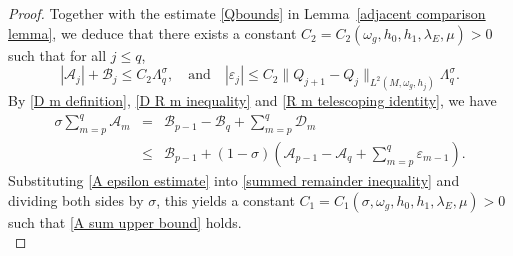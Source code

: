 \documentclass[12pt, reqno]{amsart}
\newcommand\cA{{\mathcal A}}
\newcommand\cB{{\mathcal B}}
\newcommand\cD{{\mathcal D}}
\theoremstyle{plain}
\theoremstyle{definition}
\newcommand{\qtq}[1]{\quad\mbox{#1}\quad}
\renewcommand{\>}{\rightarrow}
\newcommand{\om}{\omega}
\numberwithin{equation}{section}
\begin{document}
\begin{proof}
	Together with the estimate \eqref{Qbounds} in Lemma~\ref{adjacent comparison lemma}, we deduce that there exists a constant $C_2=C_2(\omega_g,h_0,h_1,\lambda_E,\mu)>0$ such that for all $j\leq q$,
	\begin{equation}
	|\cA_j|+\cB_j\leq C_2\Lambda_q^\sigma,
	\qtq{and}
	|\varepsilon_j|
	\leq C_2\|Q_{j+1}-Q_j\|_{L^2(M,\om_g,h_j)}\Lambda_q^\sigma.
	\label{A epsilon estimate}
	\end{equation}
	By \eqref{D m definition}, \eqref{D R m inequality} and \eqref{R m telescoping identity}, we have
	\begin{eqnarray}
	\sigma\sum_{m=p}^q\cA_m
	&=&\cB_{p-1}-\cB_q+\sum_{m=p}^q\cD_m\nonumber\\
	&\leq&\cB_{p-1}
	+(1-\sigma)\left(\cA_{p-1}-\cA_q+
	\sum_{m=p}^q\varepsilon_{m-1}\right).
	\label{summed remainder inequality}
	\end{eqnarray}
	Substituting \eqref{A epsilon estimate} into \eqref{summed remainder inequality} and dividing both sides by $\sigma$, this yields a constant $C_1=C_1(\sigma,\omega_g,h_0,h_1,\lambda_E,\mu)>0$ such that \eqref{A sum upper bound} holds.\\
	

\end{proof}
\end{document}
